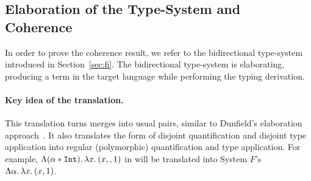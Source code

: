 \subsection{Elaboration of the Type-System and Coherence} 
In order to prove the coherence result, we refer to the bidirectional type-system introduced in
Section~\ref{sec:fi}. 
The bidirectional type-system is elaborating, producing a term in the target language while
performing the typing derivation.

\paragraph{Key idea of the translation.}
This translation turns merges into usual pairs, similar to Dunfield's
elaboration approach~\cite{dunfield2014elaborating}.
It also translates the form of disjoint quantification and disjoint type application into regular (polymorphic) 
quantification and type application. 
For example, $\Lambda (\alpha*\texttt{Int}).\, \lambda x.\, (x ,, 1)$ in \name will be translated into System $F$'s 
$\Lambda \alpha.\, \lambda x.\, (x, 1)$.
\begin{comment}
This is achieved by means of the type-directed translation.
Note that, when performing type application, the type-system will ensure that the type being applied is compatible
with the disjoint constraint, otherwise the program is rejected.
For example, applying the term above to $\tychar$ would be accepted, and the generated term would translate this
into System $F$'s type application.
On the other hand, applying the term to $\tyint$ would be rejected, and hence the target term produced is meaningless.
\end{comment}

\begin{comment}
For example, \[ 1 \mergeop \code{"one"} \] becomes \pair 1
{\code{"one"}}. In usage, the pair will be coerced according to type
information. For example, consider the function application: \[ \app {(\lamty x
\tystring x)} {(1 \mergeop \code{"one"})} \] This expression will be translated to \[ \app
{(\lamty x \tystring x)} {(\app {(\lamty x {\pair \tyint \tystring} {\proj 2 x})}
{\pair 1 {\code{"one"}}})} \] The coercion in this case is $(\lamty x {\pair
\tyint \tystring} {\proj 2 x})$. It extracts the second item from the pair, since
the function expects a $\tystring$ but the translated argument is of type $\pair
\tyint \tystring$.
\end{comment}

